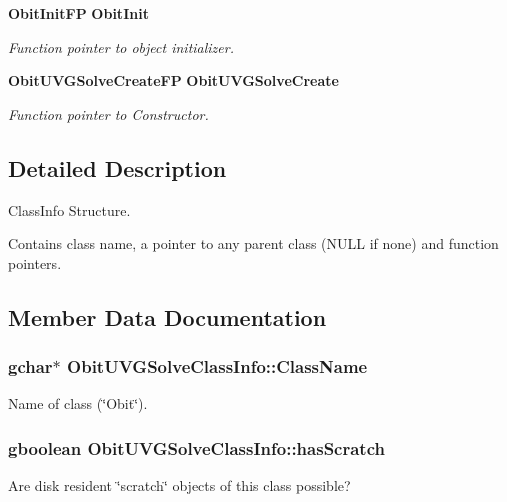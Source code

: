 \begin{CompactItemize}
{\bf Obit\-Init\-FP} {\bf Obit\-Init}
\begin{CompactList}\small\item\em Function pointer to object initializer. \item\end{CompactList}\item 
{\bf Obit\-UVGSolve\-Create\-FP} {\bf Obit\-UVGSolve\-Create}
\begin{CompactList}\small\item\em Function pointer to Constructor. \item\end{CompactList}\end{CompactItemize}


\subsection{Detailed Description}
Class\-Info Structure. 

Contains class name, a pointer to any parent class (NULL if none) and function pointers. 



\subsection{Member Data Documentation}
\subsubsection{\setlength{\rightskip}{0pt plus 5cm}gchar$\ast$ {\bf Obit\-UVGSolve\-Class\-Info::Class\-Name}}\label{structObitUVGSolveClassInfo_o2}


Name of class (\char`\"{}Obit\char`\"{}). 

\subsubsection{\setlength{\rightskip}{0pt plus 5cm}gboolean {\bf Obit\-UVGSolve\-Class\-Info::has\-Scratch}}\label{structObitUVGSolveClassInfo_o1}


Are disk resident \char`\"{}scratch\char`\"{} objects of this class possible? 

